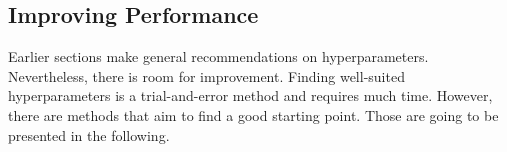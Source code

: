 \subsection{Improving Performance}
\label{sec:neural-networks-improving-performance}
Earlier sections make general recommendations on hyperparameters.
Nevertheless, there is room for improvement.
Finding well-suited hyperparameters is a trial-and-error method and requires much time.
However, there are methods that aim to find a good starting point.
Those are going to be presented in the following.



